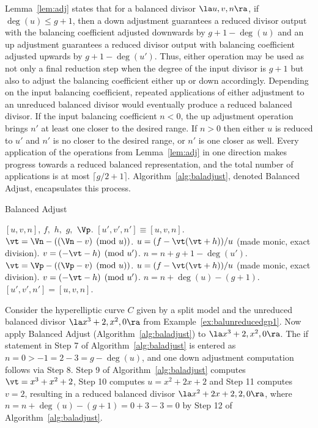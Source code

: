 Lemma~\ref{lem:adj} states that for a balanced divisor $\la u,v,n \ra$, if
$\deg(u) \leq g+1$, then a down adjustment guarantees a reduced divisor output
with the balancing coefficient adjusted downwards by $g+1 - \deg(u)$ and an up
adjustment guarantees a reduced divisor output with balancing coefficient
adjusted upwards by $g+1 - \deg(u')$. Thus, either operation may be used as not
only a final reduction step when the degree of the input divisor is $g+1$ but
also to adjust the balancing coefficient either up or down accordingly.
Depending on the input balancing coefficient, repeated applications of either
adjustment to an unreduced balanced divisor would eventually produce a reduced
balanced divisor. If the input balancing coefficient $n <0$, the up adjustment operation
brings $n'$ at least one closer to the desired range. If $n >0$ then either $u$
is reduced to $u'$ and $n'$ is no closer to the desired range, or $n'$ is one
closer as well. Every application of the operations from Lemma~\ref{lem:adj} in
one direction makes progress towards a reduced balanced representation, and the
total number of applications is at most $\lceil g/2 + 1 \rceil$.
Algorithm~\ref{alg:baladjust}, denoted Balanced Adjust, encapsulates this
process.



\begin{algorithm}[ht]
  \caption{Balanced Adjust}
  \label{alg:baladjust}
  {\fontsize{12}{18}\selectfont
  \begin{algorithmic}[1]
  \Require $[u,v,n]$, $f,$ $h,$ $g,$ $\Vp$.
  \Ensure $[u',v',n'] \equiv [u,v,n]$.
  \vspace{5pt}
      \State $\vt = \Vn - ((\Vn - v) \pmod{u})$.
      \State $u = (f - \vt(\vt + h))/u$ (made monic, exact division).  
      \State $v = (-\vt - h) \pmod{u'}$.
      \State $n = n + g + 1 - \deg(u')$.
    \EndWhile
      \State $\vt = \Vp  - ((\Vp - v) \pmod{u})$.
      \State $u = (f - \vt(\vt + h))/u$ (made monic, exact division).  
      \State $v = (-\vt - h) \pmod{u'}$.
      \State $n = n + \deg(u) - (g + 1)$.
    \EndWhile
  \EndIf
  \State \Return $[u',v',n'] = [u,v,n]$.
  \end{algorithmic}
  }
\end{algorithm}

\be\label{ex:baladj} Consider the hyperelliptic curve $C$ given by a split model
and the unreduced balanced divisor $\la x^3 + 2, x^2, 0 \ra$ from
Example~\ref{ex:balunreducedgp1}. Now apply Balanced Adjust
(Algorithm~\ref{alg:baladjust}) to $\la x^3 + 2, x^2, 0 \ra$. The if statement
in Step 7 of Algorithm~\ref{alg:baladjust} is entered as $n=0 > -1 = 2- 3 = g -
\deg(u)$, and one down adjustment computation follows via Step 8. Step 9 of
Algorithm~\ref{alg:baladjust} computes $\vt = x^3 + x^2 + 2$, Step 10 computes
$u = x^2 + 2x + 2$ and Step 11 computes $v = 2$, resulting in a reduced balanced
divisor $\la x^2 + 2x + 2, 2, 0 \ra$, where $n = n + \deg(u) - (g+1) = 0 + 3 -3
=0$ by Step 12 of Algorithm~\ref{alg:baladjust}.
\ee

